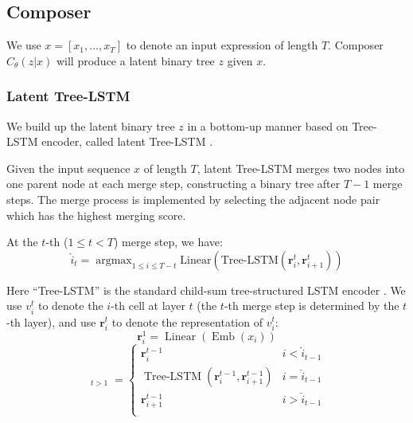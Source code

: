 \documentclass[11pt,a4paper]{article}
\begin{document}
\subsection{Composer}

We use $x=[x_1,...,x_T]$ to denote an input expression of length $T$.
Composer $C_\theta(z|x)$ will produce a latent binary tree $z$ given $x$.




\subsubsection{Latent Tree-LSTM}

We build up the latent binary tree $z$ in a bottom-up manner based on Tree-LSTM encoder, called latent Tree-LSTM \cite{choi2018learning-lt, havrylov2019cooperative-lt}.

Given the input sequence $x$ of length $T$, latent Tree-LSTM merges two nodes into one parent node at each merge step, constructing a binary tree after $T-1$ merge steps.
The merge process is implemented by selecting the adjacent node pair which has the highest merging score.

At the $t$-th ($1\leq t < T$) merge step, we have:
\begin{equation}\label{eq:ihat}
\hat{i}_t = \mathop{\arg\max}_{1\leq i \leq T-t}\text{Linear} (\text{Tree-LSTM} (  \mathbf{r}_i^t, \mathbf{r}_{i+1}^t ) )
\end{equation}

Here ``Tree-LSTM'' is the standard child-sum tree-structured LSTM encoder \cite{tree_lstm_2015-trls}.
We use $v_i^t$ to denote the $i$-th cell at layer $t$ (the $t$-th merge step is determined by the $t$-th layer), and use $\mathbf{r}_i^t$ to denote the representation of $v_i^t$:
\begin{equation}
    \mathbf{r}_{i}^{1}
    =\operatorname{Linear}(\operatorname{Emb}(x_i))
\end{equation}
\begin{equation}\label{eq:treelstm}
\mathop{\mathbf{r}_{i}^{t}}_{t>1}=
\begin{cases}
\mathbf{r}_{i}^{t-1} & i<\hat{i}_{t-1}\\
\operatorname{Tree-LSTM} (  \mathbf{r}_i^{t-1}, \mathbf{r}_{i+1}^{t-1} ) & i=\hat{i}_{t-1}\\
\mathbf{r}_{i+1}^{t-1} & i>\hat{i}_{t-1}\\
\end{cases}
\end{equation}
\end{document}

